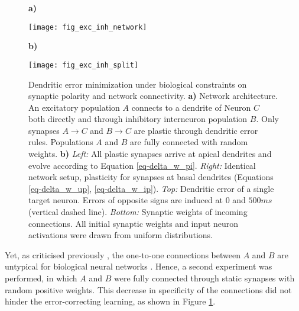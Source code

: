  \begin{figure}[t]
    \centering
    \begin{minipage}{0.2\textwidth}
        \textbf{a)}\par\medskip
        \centering
        \texttt{[image: fig\_exc\_inh\_network]}
    \end{minipage}\hfill
    \begin{minipage}{0.7\textwidth}
        \textbf{b)}\par\medskip
        \centering
        \texttt{[image: fig\_exc\_inh\_split]}
    \end{minipage}
    \caption{Dendritic error minimization under biological constraints on synaptic polarity and network connectivity.
        \textbf{a)} Network architecture. An excitatory population $A$ connects to a dendrite of Neuron $C$ both
        directly and through inhibitory interneuron population $B$. Only synapses $A\rightarrow C$ and $B \rightarrow C$
        are plastic through dendritic error rules. Populations $A$ and $B$ are fully connected with random weights.
        \textbf{b)} \textit{Left:} All plastic synapses arrive at apical dendrites and evolve according to Equation
        \ref{eq-delta_w_pi}. \textit{Right:} Identical network setup, plasticity for synapses at basal dendrites
        (Equations \ref{eq-delta_w_up}, \ref{eq-delta_w_ip}). \textit{Top:} Dendritic error of a single target neuron.
        Errors of opposite signs are induced at $0$ and $500ms$ (vertical dashed line). \textit{Bottom:} Synaptic
        weights of incoming connections. All initial synaptic weights and input neuron activations were drawn from
        uniform distributions.}
    \label{fig-exc-inh-split}
\end{figure}

Yet, as criticised previously \citep{whittington2019theories}, the one-to-one connections between $A$ and $B$ are
untypical for biological neural networks \citeme. Hence, a second experiment was performed, in which $A$ and $B$ were
fully connected through static synapses with random positive weights. This decrease in specificity of the connections
did not hinder the error-correcting learning, as shown in Figure \ref{fig-exc-inh-split}.

